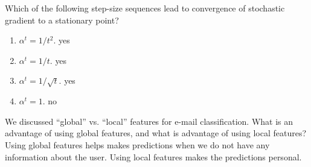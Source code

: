\documentclass{article}
\def\red#1{{\color{red}#1}}
\def\enum#1{\begin{enumerate}#1\end{enumerate}}
\begin{document}
{\item Which of the following step-size sequences lead to convergence of stochastic gradient to a stationary point?
\enum{
\item $\alpha^t = 1/t^2$. \red{yes}
\item $\alpha^t = 1/t$. \red{yes}
\item $\alpha^t = 1/\sqrt{t}$. \red{yes}
\item $\alpha^t = 1$. \red{no}
}
\item We discussed ``global'' vs. ``local'' features for e-mail classification. What is an advantage of using global features, and what is advantage of using local features? \red{Using global features helps makes predictions when we do not have any information about the user. Using local features makes the predictions personal.}
}
\end{document}
